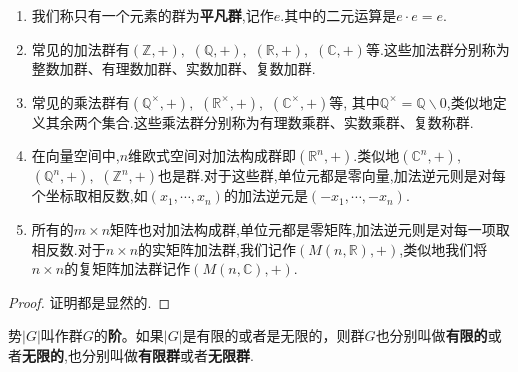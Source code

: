 \documentclass[../../main.tex]{subfiles}
\begin{document}
\begin{example}[$\,\,$常见的群]
\begin{enumerate}
\item 我们称只有一个元素的群为\textbf{平凡群},记作${e}$.其中的二元运算是$e\cdot e=e$.
\item 常见的加法群有$(\mathbb{Z},+),$ $(\mathbb{Q},+),$ $(\mathbb{R},+),$ $(\mathbb{C},+)$等.这些加法群分别称为整数加群、有理数加群、实数加群、复数加群.
\item 常见的乘法群有$(\mathbb{Q}^\times,+),$ $(\mathbb{R}^\times,+),$ $(\mathbb{C}^\times,+)$等, 其中$\mathbb{Q}^\times=\mathbb{Q}\backslash {0}$,类似地定义其余两个集合.这些乘法群分别称为有理数乘群、实数乘群、复数称群.
\item 在向量空间中,$n$维欧式空间对加法构成群即$(\mathbb{R}^n,+)$.类似地$(\mathbb{C}^n,+),$ $(\mathbb{Q}^n,+),$ $(\mathbb{Z}^n,+)$也是群.对于这些群,单位元都是零向量,加法逆元则是对每个坐标取相反数,如$(x_1,\cdots,x_n)$的加法逆元是$(-x_1,\cdots,-x_n)$.
\item 所有的$m\times n$矩阵也对加法构成群,单位元都是零矩阵,加法逆元则是对每一项取相反数.对于$n\times n$的实矩阵加法群,我们记作$(M(n,\mathbb{R}),+)$,类似地我们将$n\times n$的复矩阵加法群记作$(M(n,\mathbb{C}),+)$.
\end{enumerate}
\end{example}
\begin{proof}
证明都是显然的.

\end{proof}

\begin{definition}[阶]
势$|G|$叫作群$G$的\textbf{阶}。如果$|G|$是有限的或者是无限的，则群$G$也分别叫做\textbf{有限的}或者\textbf{无限的},也分别叫做\textbf{有限群}或者\textbf{无限群}. 
\end{definition}
\end{document}
